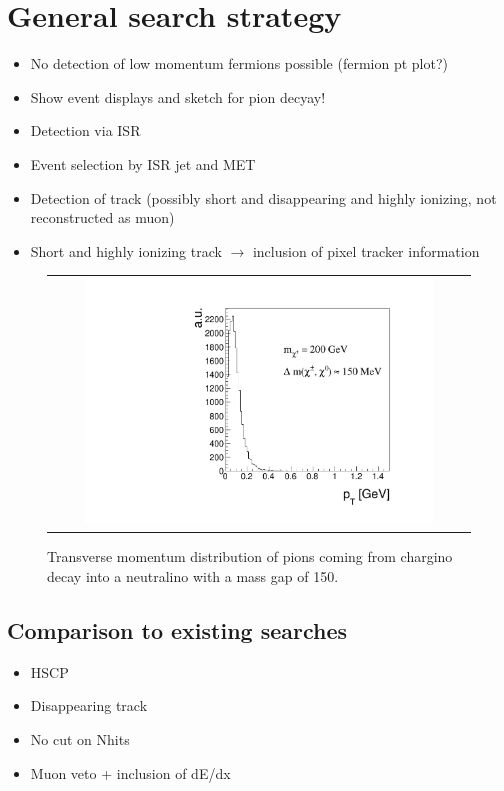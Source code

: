 \section{General search strategy}
\label{sec:GeneralSearchStrategy}
\begin{itemize}
\item No detection of low momentum fermions possible (fermion pt plot?)
\item Show event displays and sketch for pion decyay!
\item Detection via ISR 
\item Event selection by ISR jet and MET
\item Detection of track (possibly short and disappearing and highly ionizing, not reconstructed as muon)
\item Short and highly ionizing track $\rightarrow$ inclusion of pixel tracker information 
\end{itemize}

\begin{figure}[!tp]
  \centering 
  \begin{tabular}{c}
    \includegraphics[width=0.85\textwidth]{figures/analysis/ptOfPions.pdf}
  \end{tabular}
  \caption{Transverse momentum distribution of pions coming from chargino decay into a neutralino with a mass gap of 150\mev.}
  \label{fig:ptOfPions}
\end{figure}


\subsection{Comparison to existing searches}
\begin{itemize}
\item HSCP
\item Disappearing track
\item No cut on Nhits
\item Muon veto + inclusion of dE/dx
\end{itemize}

